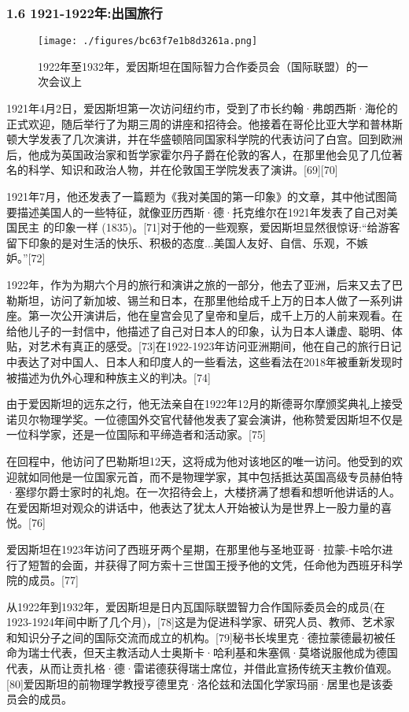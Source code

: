 \subsubsection{1.6 1921-1922年:出国旅行}
\begin{figure}[ht]
\centering
\texttt{[image: ./figures/bc63f7e1b8d3261a.png]}
\caption{1922年至1932年，爱因斯坦在国际智力合作委员会（国际联盟）的一次会议上} \label{fig_AYST_8}
\end{figure}
1921年4月2日，爱因斯坦第一次访问纽约市，受到了市长约翰·弗朗西斯·海伦的正式欢迎，随后举行了为期三周的讲座和招待会。他接着在哥伦比亚大学和普林斯顿大学发表了几次演讲，并在华盛顿陪同国家科学院的代表访问了白宫。回到欧洲后，他成为英国政治家和哲学家霍尔丹子爵在伦敦的客人，在那里他会见了几位著名的科学、知识和政治人物，并在伦敦国王学院发表了演讲。[69][70]

1921年7月，他还发表了一篇题为《我对美国的第一印象》的文章，其中他试图简要描述美国人的一些特征，就像亚历西斯·德·托克维尔在1921年发表了自己对美国民主 的印象一样 (1835)。[71]对于他的一些观察，爱因斯坦显然很惊讶:“给游客留下印象的是对生活的快乐、积极的态度...美国人友好、自信、乐观，不嫉妒。”[72]

1922年，作为为期六个月的旅行和演讲之旅的一部分，他去了亚洲，后来又去了巴勒斯坦，访问了新加坡、锡兰和日本，在那里他给成千上万的日本人做了一系列讲座。第一次公开演讲后，他在皇宫会见了皇帝和皇后，成千上万的人前来观看。在给他儿子的一封信中，他描述了自己对日本人的印象，认为日本人谦虚、聪明、体贴，对艺术有真正的感受。[73]在1922-1923年访问亚洲期间，他在自己的旅行日记中表达了对中国人、日本人和印度人的一些看法，这些看法在2018年被重新发现时被描述为仇外心理和种族主义的判决。[74]

由于爱因斯坦的远东之行，他无法亲自在1922年12月的斯德哥尔摩颁奖典礼上接受诺贝尔物理学奖。一位德国外交官代替他发表了宴会演讲，他称赞爱因斯坦不仅是一位科学家，还是一位国际和平缔造者和活动家。[75]

在回程中，他访问了巴勒斯坦12天，这将成为他对该地区的唯一访问。他受到的欢迎就如同他是一位国家元首，而不是物理学家，其中包括抵达英国高级专员赫伯特·塞缪尔爵士家时的礼炮。在一次招待会上，大楼挤满了想看和想听他讲话的人。在爱因斯坦对观众的讲话中，他表达了犹太人开始被认为是世界上一股力量的喜悦。[76]

爱因斯坦在1923年访问了西班牙两个星期，在那里他与圣地亚哥·拉蒙-卡哈尔进行了短暂的会面，并获得了阿方索十三世国王授予他的文凭，任命他为西班牙科学院的成员。[77]

从1922年到1932年，爱因斯坦是日内瓦国际联盟智力合作国际委员会的成员(在1923-1924年间中断了几个月)，[78]这是为促进科学家、研究人员、教师、艺术家和知识分子之间的国际交流而成立的机构。[79]秘书长埃里克·德拉蒙德最初被任命为瑞士代表，但天主教活动人士奥斯卡·哈利基和朱塞佩·莫塔说服他成为德国代表，从而让贡扎格·德·雷诺德获得瑞士席位，并借此宣扬传统天主教价值观。[80]爱因斯坦的前物理学教授亨德里克·洛伦兹和法国化学家玛丽·居里也是该委员会的成员。

